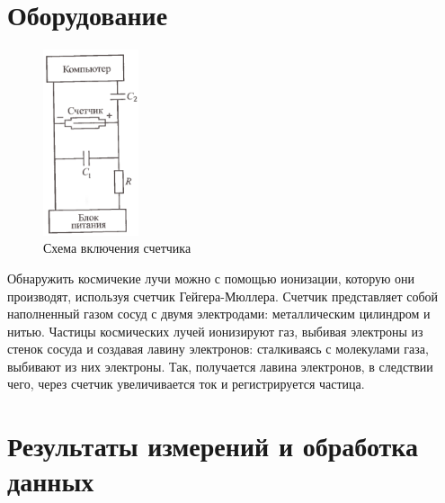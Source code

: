 \documentclass[a4paper,12pt]{article}
\begin{document}
\section{Оборудование}
\begin{figure}[H]
\centering
\includegraphics[width=0.25\textwidth]{счётчик}
\caption{Схема включения счетчика} 
\end{figure}

Обнаружить космичекие лучи можно с помощью ионизации, которую они производят, используя счетчик Гейгера-Мюллера. Счетчик представляет собой наполненный газом сосуд с двумя электродами: металлическим цилиндром и нитью. Частицы космических лучей ионизируют газ, выбивая электроны из стенок сосуда и создавая лавину электронов: сталкиваясь с молекулами газа, выбивают из них электроны. Так, получается лавина электронов, в следствии чего, через счетчик увеличивается ток и регистрируется частица. 

\section{Результаты измерений и обработка данных}
\end{document}
